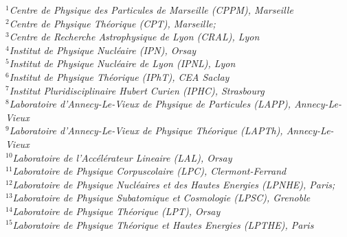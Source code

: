 \documentclass{article}
\begin{document}
\begin{titlepage}
\begin{flushleft}
{\it
\footnotesize
$ ^{1}$Centre de Physique des Particules de Marseille (CPPM), Marseille\\  
$ ^{2}$Centre de Physique Th\'{e}orique (CPT),  Marseille; \\           
$ ^{3}$Centre de Recherche Astrophysique de Lyon (CRAL), Lyon \\
$ ^{4}$Institut de Physique Nucl\'{e}aire (IPN), Orsay \\
$ ^{5}$Institut de Physique Nucl\'{e}aire de Lyon (IPNL), Lyon\\
$ ^{6}$Institut de Physique Th\'{e}orique (IPhT), CEA Saclay \\
$ ^{7}$Institut Pluridisciplinaire Hubert Curien (IPHC), Strasbourg\\
$ ^{8}$Laboratoire d'Annecy-Le-Vieux de Physique de Particules (LAPP), Annecy-Le-Vieux\\
$ ^{9}$Laboratoire d'Annecy-Le-Vieux de Physique Th\'{e}orique (LAPTh), Annecy-Le-Vieux\\
$ ^{10}$Laboratoire de l'Acc\'{e}l\'{e}rateur Lineaire (LAL), Orsay\\
$ ^{11}$Laboratoire de Physique Corpuscolaire (LPC), Clermont-Ferrand\\
$ ^{12}$Laboratoire de Physique Nucl\'{e}aires et des Hautes Energies (LPNHE), Paris; \\
$ ^{13}$Laboratoire de Physique Subatomique et Cosmologie (LPSC), Grenoble\\
$ ^{14}$Laboratoire de Physique Th\'{e}orique (LPT), Orsay \\
$ ^{15}$Laboratoire de Physique Th\'{e}orique et Hautes Energies (LPTHE), Paris\\
}

\end{flushleft}


\end{titlepage}







\end{document}

